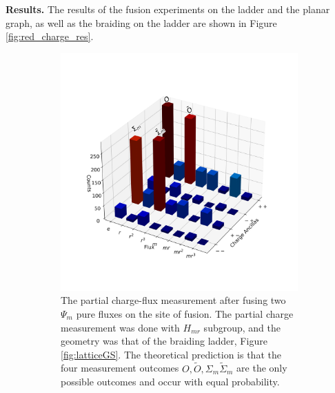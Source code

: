 \documentclass[a4paper,twocolumn,11pt]{quantumarticle}
\begin{document}
\textbf{Results.}
The results of the fusion experiments on the ladder and the planar graph, as well as the braiding on the ladder are shown in Figure \ref{fig:red_charge_res}.

\begin{figure}
\centering
\begin{subfigure}{0.47\textwidth}
    \includegraphics[width = \linewidth]{Figures/fusion_on_glasses.png}
    \caption{The partial charge-flux measurement after fusing two $\Psi_m$ pure fluxes on the site of fusion. The partial charge measurement was done with $H_{mr}$ subgroup, and the geometry was that of the braiding ladder, Figure \ref{fig:latticeGS}. The theoretical prediction is that the four measurement outcomes $O,\tilde O,\Sigma_m \tilde{\Sigma}_m$ are the only possible outcomes and occur with equal probability.}
    \label{fig:fusion_glass}
\end{subfigure}\hfill
\begin{subfigure}{0.47\textwidth}

\end{subfigure}
\end{figure}
\end{document}
